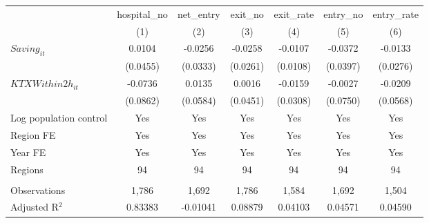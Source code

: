 \begingroup
\centering
\begin{tabular}{lcccccc}
   \toprule
                          & hospital\_no  & net\_entry  & exit\_no  & exit\_rate  & entry\_no  & entry\_rate \\    
                          & (1)           & (2)         & (3)       & (4)         & (5)        & (6)\\  
   \midrule 
   $Saving_{it}$          & 0.0104        & -0.0256     & -0.0258   & -0.0107     & -0.0372    & -0.0133\\   
                          & (0.0455)      & (0.0333)    & (0.0261)  & (0.0108)    & (0.0397)   & (0.0276)\\   
   $KTXWithin2h_{it}$     & -0.0736       & 0.0135      & 0.0016    & -0.0159     & -0.0027    & -0.0209\\   
                          & (0.0862)      & (0.0584)    & (0.0451)  & (0.0308)    & (0.0750)   & (0.0568)\\   
   Log population control & Yes           & Yes         & Yes       & Yes         & Yes        & Yes\\  
   Region FE              & Yes           & Yes         & Yes       & Yes         & Yes        & Yes\\  
   Year FE                & Yes           & Yes         & Yes       & Yes         & Yes        & Yes\\  
   Regions                & 94            & 94          & 94        & 94          & 94         & 94\\  
    \\
   Observations           & 1,786         & 1,692       & 1,786     & 1,584       & 1,692      & 1,504\\  
   Adjusted R$^2$         & 0.83383       & -0.01041    & 0.08879   & 0.04103     & 0.04571    & 0.04590\\  
   \bottomrule
\end{tabular}
\par\endgroup
